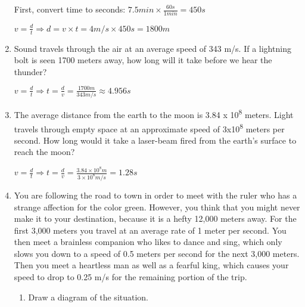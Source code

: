 \documentclass[letterpaper, 12pt]{article}
\begin{document}
\begin{enumerate}
\color{red}

\begin{center} First, convert time to seconds: $ 7.5 min \times \frac{60s}{1min} = 450 s$
	
	\vspace{0.1in}
	
$	v = \frac{d}{t} \Longrightarrow d = v \times t = 4 m/s \times 450 s = 1800 m $
	
\end{center}


\vspace{0.05in}
\color{black}



\item Sound travels through the air at an average speed of 343 m/s. If a lightning bolt is seen 1700 meters away, how long will it take before we hear the thunder?
\color{red}

\begin{center} $ v = \frac{d}{t} \Longrightarrow t = \frac{d}{v} = \frac{1700m}{343m/s} \approx 4.956 s $
	
\end{center}


\vspace{0.15in}
\color{black}




\item The average distance from the earth to the moon is 3.84 x 10\textsuperscript{8} meters.  Light travels through empty space at an approximate speed of 3x10\textsuperscript{8} meters per second.  How long would it take a laser-beam fired from the earth's surface to reach the moon?

\color{red}

\begin{center} $ v = \frac{d}{t} \Longrightarrow t = \frac{d}{v} = \frac{3.84 \times 10^8 m}{3 \times 10^8 m/s} = 1.28 s $
	
\end{center}


\vspace{0.15in}
\color{black}


\item You are following the road to town in order to meet with the ruler who has a strange affection for the color green.  However, you think that you might never make it to your destination, because it is a hefty 12,000 meters away.  For the first 3,000 meters you travel at an average rate of 1 meter per second.  You then meet a brainless companion who likes to dance and sing, which only  slows you down to a speed of 0.5 meters per second for the next 3,000 meters.  Then you meet a heartless man as well as a fearful king, which causes your speed to drop to 0.25 m/s for the remaining portion of the trip.  
\begin{enumerate} \item Draw a diagram of the situation.
\color{red}


\end{enumerate}
\end{enumerate}
\end{document}
